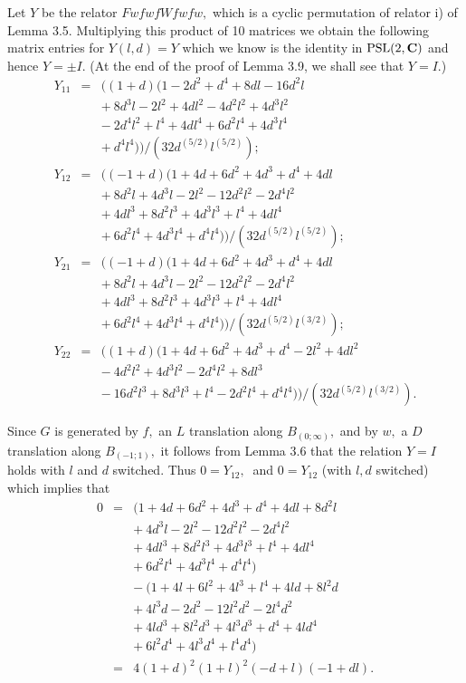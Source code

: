   Let $Y$ be the relator
$FwfwfWfwfw,$ which is a cyclic permutation of
relator i) of Lemma 3.5.   Multiplying
this product of 10 matrices we obtain the
following matrix entries for $Y(l,d) = Y$ which we know is 
the identity in ${\rm PSL}(2,{\bf C})$ and hence 
$Y = \pm I.$ (At the end of the proof of Lemma 3.9, we shall
see that $Y = I.$)
\begin{eqnarray*}
Y_{11}&=&((1 + d) (1 - 2d^2 + d^4 + 8dl - 16d^2l \\
              &&  +\ 8d^3l - 2l^2 + 4dl^2 - 4d^2l^2 + 4d^3l^2 \\
        &&-\ 2d^4l^2 + l^4 + 4dl^4 + 6d^2l^4 + 4d^3l^4\\
      &&  +\ d^4l^4))/(32d^{(5/2)}l^{(5/2)});\\
Y_{12}&=& ((-1 + d)
(1 + 4d + 6d^2 + 4d^3 + d^4 + 4dl \\
        &&+\       8d^2l + 4d^3l - 2l^2 - 12d^2l^2 - 2d^4l^2 \\
&&+\ 
        4dl^3 + 8d^2l^3 + 4d^3l^3 + l^4 + 4dl^4 \\
&&+\
        6d^2l^4 + 4d^3l^4 + d^4l^4))/(32d^{(5/2)}l^{(5/2)});\\
Y_{21}& =& ((-1 + d)
(1 + 4d + 6d^2 + 4d^3 + d^4 + 4dl \\
&&+\
                8d^2l + 4d^3l - 2l^2 - 12d^2l^2 - 2d^4l^2 \\
&&+\
        4dl^3 + 8d^2l^3 + 4d^3l^3 + l^4 + 4dl^4\\
&&+\
        6d^2l^4 + 4d^3l^4 + d^4l^4))/(32d^{(5/2)}l^{(3/2)});
\\ Y_{22}& =& ((1 + d)(1 + 4d + 6d^2 + 4d^3 + d^4 - 2l^2 + 4dl^2\\
&&- \ 
                4d^2l^2 + 4d^3l^2 - 2d^4l^2 + 8dl^3 \\
&&-\ 
        16d^2l^3 + 8d^3l^3 + l^4 - 2d^2l^4 + d^4l^4))         /(32d^{(5/2)}l^{(3/2)})
. \end{eqnarray*}


Since $G$ is generated by $f,$ an $L$ translation  along $B_{(0;\infty)},$
and by $w,$ a $D$ translation along $B_{(-1;1)},$ it follows from 
Lemma 3.6 that the relation $Y=I$ holds with $l$
and $d$ switched.  Thus $0=Y_{12},\ $ and $0=Y_{12}$ (with $l,d$ switched)
which implies that
\begin{eqnarray*}
0&=&(1 + 4d + 6d^2 + 4d^3 + d^4 + 4dl + 8d^2l\\
&&+\ 
                4d^3l - 2l^2 - 12d^2l^2 - 2d^4l^2\\
&&+\ 
                4dl^3 + 8d^2l^3 + 4d^3l^3 + l^4 + 4dl^4\\
&&+\ 
                6d^2l^4 + 4d^3l^4 + d^4l^4)\\
&&-\ 
                (1 + 4l + 6l^2 + 4l^3 + l^4 + 4ld + 8l^2d\\
&&+\ 
                4l^3d - 2d^2 - 12l^2d^2 - 2l^4d^2\\
&&+\ 
                 4ld^3 + 8l^2d^3 + 4l^3d^3 + d^4 + 4ld^4\\
&&+\ 
                6l^2d^4 + 4l^3d^4 + l^4d^4)\\
&=& 4(1 + d)^2(1 + l)^2(-d + l)(-1 + dl).
\end{eqnarray*}

